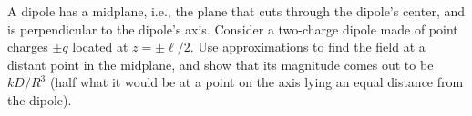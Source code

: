 A dipole has a midplane, i.e., the plane that cuts through the dipole's
        center, and is perpendicular to the dipole's axis.
        Consider a two-charge dipole made of point charges $\pm q$ located
        at $z=\pm\ell/2$. Use approximations to find the field at a distant
        point in the midplane, and show that its magnitude comes out to be 
        $kD/R^3$ (half what it would be at a point on the axis lying an equal distance
        from the dipole).
